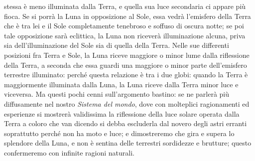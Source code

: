 \documentclass[11pt,twoside,openany]{book}
\begin{document}
stessa è meno illuminata dalla Terra, e quella sua luce secondaria ci appare più fioca. Se si porrà la Luna in opposizione al Sole, essa vedrà l'emisfero della Terra che è tra lei e il Sole completamente tenebroso e soffuso di oscura notte; se poi tale opposizione sarà eclittica, la Luna non riceverà illuminazione alcuna, priva sia dell'illuminazione del Sole sia di quella della Terra. Nelle sue differenti posizioni fra Terra e Sole, la Luna riceve maggiore o minor lume dalla riflessione della Terra, a seconda che essa guardi una maggiore o minor parte dell'emisfero terrestre illuminato: perché questa relazione è tra i due globi: quando la Terra è maggiormente illuminata dalla Luna, la Luna riceve dalla Terra minor luce e viceversa. Ma questi pochi cenni sull'argomento bastino: se ne parlerà più diffusamente nel nostro \textit{Sistema del mondo}, dove con molteplici ragionamenti ed esperienze si mostrerà validissima la riflessione della luce solare operata dalla Terra a coloro che van dicendo si debba escluderla dal novero degli astri erranti soprattutto perché non ha moto e luce; e dimostreremo che gira e supera lo splendore della Luna, e non è sentina delle terrestri sordidezze e brutture; questo confermeremo con infinite ragioni naturali.
\end{document}
